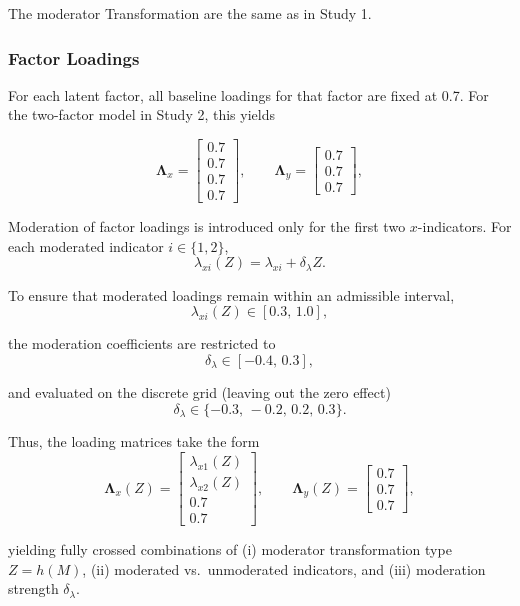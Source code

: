 \documentclass[
  man,
  floatsintext]{apa7}
\begin{document}
The moderator Transformation are the same as in Study 1.

\subsubsection{Factor Loadings}\label{factor-loadings-1}

For each latent factor, all baseline loadings for that factor are fixed
at 0.7. For the two-factor model in Study 2, this yields

\[
\boldsymbol{\Lambda}_x =
\begin{bmatrix}
0.7\\
0.7\\
0.7\\
0.7
\end{bmatrix},
\qquad
\boldsymbol{\Lambda}_y =
\begin{bmatrix}
0.7\\
0.7\\
0.7
\end{bmatrix},
\]

Moderation of factor loadings is introduced only for the first two
\(x\)-indicators. For each moderated indicator \(i \in \{1,2\}\), \[
\lambda_{xi}(Z) = \lambda_{xi} + \delta_{\lambda} Z .
\]

To ensure that moderated loadings remain within an admissible interval,
\[
\lambda_{xi}(Z) \in [0.3,\,1.0],
\]

the moderation coefficients are restricted to \[
\delta_{\lambda} \in [-0.4,\,0.3],
\]

and evaluated on the discrete grid (leaving out the zero effect) \[
\delta_{\lambda} \in \{-0.3,\,-0.2,\,0.2,\,0.3\}.
\]

Thus, the loading matrices take the form \[
\boldsymbol{\Lambda}_x(Z)=
\begin{bmatrix}
\lambda_{x1}(Z)\\
\lambda_{x2}(Z)\\
0.7\\
0.7
\end{bmatrix},
\qquad
\boldsymbol{\Lambda}_y(Z)=
\begin{bmatrix}
0.7\\
0.7\\
0.7
\end{bmatrix},
\]

yielding fully crossed combinations of (i) moderator transformation type
\(Z=h(M)\), (ii) moderated vs.~unmoderated indicators, and (iii)
moderation strength \(\delta_{\lambda}\).
\end{document}
